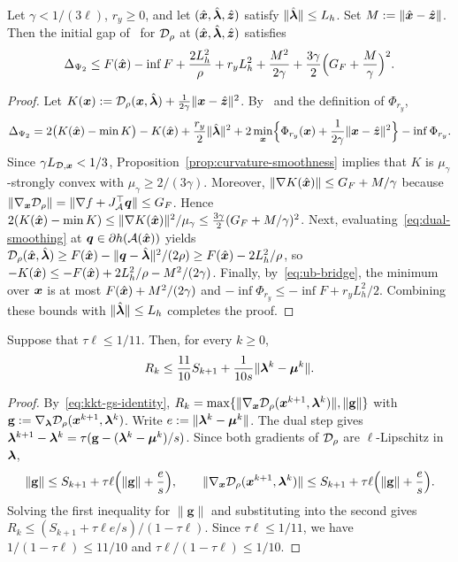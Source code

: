 \begin{lemma}
\label{lem:ub-initial-gap}
Let \(\gamma<1/(3\ell)\), \(r_y\ge0\), and let \((\hat{\bm{x}},\hat{\bm{\lambda}},\hat{\bm{z}})\)
satisfy \(\|\hat{\bm{\lambda}}\|\le L_h\). Set \(M:=\|\hat{\bm{x}}-\hat{\bm{z}}\|\). Then the
initial gap of~\cite[Definition~3.1(ii)]{li2026smoothing} for \(\mathcal{D}_\rho\)
at \((\hat{\bm{x}},\hat{\bm{\lambda}},\hat{\bm{z}})\) satisfies
\[
\Delta_{\Psi_2}
\le F(\hat{\bm{x}})-\inf F+\frac{2L_h^2}{\rho}+r_yL_h^2+\frac{M^2}{2\gamma}
+\frac{3\gamma}{2}\Bigl(G_F+\frac M\gamma\Bigr)^2 .
\]
\end{lemma}

\begin{proof}
Let \(K(\bm{x}):=\mathcal{D}_\rho(\bm{x},\hat{\bm{\lambda}})+\frac1{2\gamma}\|\bm{x}-\hat{\bm{z}}\|^2\).
By~\cite[(3.1) and Definition~3.1(ii)]{li2026smoothing} and the definition
of \(\Phi_{r_y}\),
\[
\Delta_{\Psi_2}
=2\bigl(K(\hat{\bm{x}})-\min K\bigr)-K(\hat{\bm{x}})+\frac{r_y}2\|\hat{\bm{\lambda}}\|^2
+2\min_{\bm{x}}\Bigl\{\Phi_{r_y}(\bm{x})+\frac1{2\gamma}\|\bm{x}-\hat{\bm{z}}\|^2\Bigr\}
-\inf\Phi_{r_y}.
\]
Since \(\gamma L_{\mathcal{D},\bm{x}}<1/3\), Proposition~\ref{prop:curvature-smoothness}
implies that \(K\) is \(\mu_\gamma\)-strongly convex with
\(\mu_\gamma\ge2/(3\gamma)\). Moreover,
\(\|\nabla K(\hat{\bm{x}})\|\le G_F+M/\gamma\) because
\(\|\nabla_{\bm{x}}\mathcal{D}_\rho\|=\|\nabla f+J_{\mathcal{A}}^\top\bm{q}\|\le G_F\). Hence
\(2(K(\hat{\bm{x}})-\min K)\le\|\nabla K(\hat{\bm{x}})\|^2/\mu_\gamma
\le\frac{3\gamma}2(G_F+M/\gamma)^2\). Next, evaluating~\eqref{eq:dual-smoothing}
at \(\bm{q}\in\partial h(\mathcal{A}(\hat{\bm{x}}))\) yields
\(\mathcal{D}_\rho(\hat{\bm{x}},\hat{\bm{\lambda}})\ge F(\hat{\bm{x}})-\|\bm{q}-\hat{\bm{\lambda}}\|^2/(2\rho)
\ge F(\hat{\bm{x}})-2L_h^2/\rho\), so
\(-K(\hat{\bm{x}})\le-F(\hat{\bm{x}})+2L_h^2/\rho-M^2/(2\gamma)\). Finally,
by~\eqref{eq:ub-bridge}, the minimum over \(\bm{x}\) is at most
\(F(\hat{\bm{x}})+M^2/(2\gamma)\) and \(-\inf\Phi_{r_y}\le-\inf F+r_yL_h^2/2\).
Combining these bounds with \(\|\hat{\bm{\lambda}}\|\le L_h\) completes the proof.
\end{proof}

\begin{lemma}
\label{lem:ub-residual-transfer}
Suppose that \(\tau\ell\le1/11\). Then, for every \(k\ge0\),
\[
R_k\le\frac{11}{10}S_{k+1}+\frac{1}{10s}\|\bm{\lambda}^k-\bm{\mu}^k\|.
\]
\end{lemma}

\begin{proof}
By~\eqref{eq:kkt-gs-identity},
\(R_k=\max\{\|\nabla_{\bm{x}}\mathcal{D}_\rho(\bm{x}^{k+1},\bm{\lambda}^k)\|,\|\mathbf g\|\}\)
with \(\mathbf g:=\nabla_{\bm{\lambda}}\mathcal{D}_\rho(\bm{x}^{k+1},\bm{\lambda}^k)\). Write
\(e:=\|\bm{\lambda}^k-\bm{\mu}^k\|\). The dual step gives
\(\bm{\lambda}^{k+1}-\bm{\lambda}^k=\tau(\mathbf g-(\bm{\lambda}^k-\bm{\mu}^k)/s)\). Since both
gradients of \(\mathcal{D}_\rho\) are \(\ell\)-Lipschitz in \(\bm{\lambda}\),
\[
\|\mathbf g\|\le S_{k+1}+\tau\ell\Bigl(\|\mathbf g\|+\frac es\Bigr),
\qquad
\|\nabla_{\bm{x}}\mathcal{D}_\rho(\bm{x}^{k+1},\bm{\lambda}^k)\|
\le S_{k+1}+\tau\ell\Bigl(\|\mathbf g\|+\frac es\Bigr).
\]
Solving the first inequality for \(\|\mathbf g\|\) and substituting into the
second gives \(R_k\le(S_{k+1}+\tau\ell e/s)/(1-\tau\ell)\). Since
\(\tau\ell\le1/11\), we have \(1/(1-\tau\ell)\le11/10\) and
\(\tau\ell/(1-\tau\ell)\le1/10\).
\end{proof}

